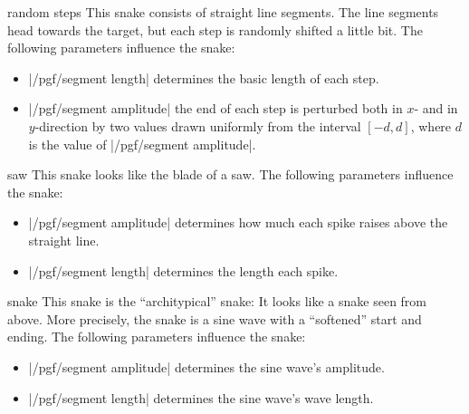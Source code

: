\begin{snake}{random steps}
  This snake consists of straight line segments. The line segments
  head towards the target, but each step is randomly shifted a little
  bit. The following parameters influence the snake:
  \begin{itemize}
  \item |/pgf/segment length|
    determines the basic length of each step.
  \item |/pgf/segment amplitude|
    the end of each step is perturbed both in $x$- and in
    $y$-direction by two values drawn uniformly from the interval
    $[-d,d]$, where $d$ is the value of |/pgf/segment amplitude|.
  \end{itemize}
\begin{codeexample}[]
\end{codeexample}
\end{snake}



\begin{snake}{saw}
  This snake looks like the blade of a saw. The following parameters
  influence the snake:
  \begin{itemize}
  \item |/pgf/segment amplitude|
    determines how much each spike raises above the straight line.
  \item |/pgf/segment length|
    determines the length each spike.
  \end{itemize}
\begin{codeexample}[]
\end{codeexample}
\end{snake}


\begin{snake}{snake}
  This snake is the ``architypical'' snake: It looks like a snake seen
  from above. More precisely, the snake is a sine wave with a
  ``softened'' start and ending. The following parameters influence
  the snake: 
  \begin{itemize}
  \item |/pgf/segment amplitude|
    determines the sine wave's amplitude.
  \item |/pgf/segment length|
    determines the sine wave's wave length.
  \end{itemize}
\begin{codeexample}[]
\end{codeexample}
\end{snake}


